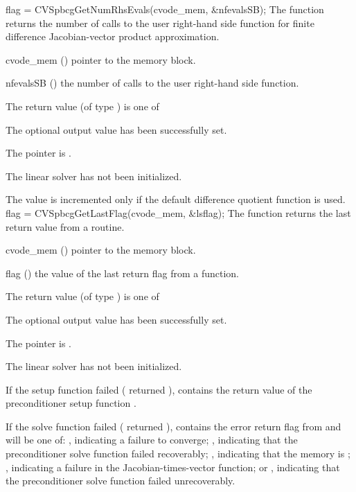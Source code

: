 {}
{
  flag = CVSpbcgGetNumRhsEvals(cvode\_mem, \&nfevalsSB);
}
{
  The function  returns the
  number of calls to the user right-hand side function for
  finite difference Jacobian-vector product approximation.
}
{
  \begin{args}
  \item[cvode\_mem] ()
    pointer to the {\cvode} memory block.
  \item[nfevalsSB] ()
    the number of calls to the user right-hand side function.
  \end{args}
}
{
  The return value  (of type ) is one of
  \begin{args}
  \item[\Id{CVSPBCG\_SUCCESS}] 
    The optional output value has been successfully set.
  \item[\Id{CVSPBCG\_MEM\_NULL}]
    The  pointer is .
  \item[\Id{CVSPBCG\_LMEM\_NULL}]
    The {\cvspbcg} linear solver has not been initialized.
  \end{args}
}
{
  The value  is incremented only if the default 
   difference quotient function is used.
}
{
  flag = CVSpbcgGetLastFlag(cvode\_mem, \&lsflag);
}
{
  The function  returns the
  last return value from a {\cvspbcg} routine. 
}
{
  \begin{args}
  \item[cvode\_mem] ()
    pointer to the {\cvode} memory block.
  \item[flag] ()
    the value of the last return flag from a {\cvspbcg} function.
  \end{args}
}
{
  The return value  (of type ) is one of
  \begin{args}
  \item[\Id{CVSPBCG\_SUCCESS}] 
    The optional output value has been successfully set.
  \item[\Id{CVSPBCG\_MEM\_NULL}]
    The  pointer is .
  \item[\Id{CVSPBCG\_LMEM\_NULL}]
    The {\cvspbcg} linear solver has not been initialized.
  \end{args}
}
{
  If the {\cvspbcg} setup function failed ( returned
  ),  contains the return value of the
  preconditioner setup function .

  If the {\cvspbcg} solve function failed ( returned
  ),  contains the error return flag from
   and will be one of:
 , indicating a failure to converge;
 , indicating that the preconditioner solve function
  failed recoverably;
  , indicating that the {\spbcg} memory is ;
  , indicating a failure in the Jacobian-times-vector
  function; or
  , indicating that the preconditioner solve
  function  failed unrecoverably.
}

